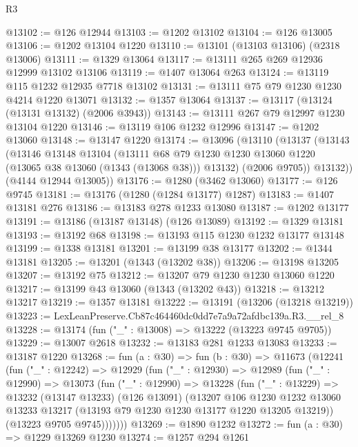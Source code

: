 \begin{lexlean}{R3}
\begin{coremodule}
@13102 := @126 @12944
@13103 := @1202 @13102
@13104 := @126 @13005
@13106 := @1202 @13104 @1220
@13110 := @13101 (@13103 @13106) (@2318 @13006)
@13111 := @1329 @13064
@13117 := @13111 @265 @269 @12936 @12999 @13102 @13106
@13119 := @1407 @13064 @263
@13124 := @13119 @115 @1232 @12935 @7718 @13102
@13131 := @13111 @75 @79 @1230 @1230 @4214 @1220 @13071
@13132 := @1357 @13064
@13137 := @13117 (@13124 (@13131 @13132) (@2006 @3943))
@13143 := @13111 @267 @79 @12997 @1230 @13104 @1220
@13146 := @13119 @106 @1232 @12996
@13147 := @1202 @13060
@13148 := @13147 @1220
@13174 := @13096
    (@13110
      (@13137
        (@13143
          (@13146
            @13148
            @13104
            (@13111
              @68
              @79
              @1230
              @1230
              @13060
              @1220
              (@13065 @38 @13060 (@1343 (@13068 @38)))
              @13132)
            (@2006 @9705))
          @13132))
      (@4144 @12944 @13005))
@13176 := @1280 (@3462 @13060)
@13177 := @126 @9745
@13181 := @13176 (@1280 (@1284 @13177) @1287)
@13183 := @1407 @13181 @276
@13186 := @13183 @278 @1233 @13080
@13187 := @1202 @13177
@13191 := @13186 (@13187 @13148) (@126 @13089)
@13192 := @1329 @13181
@13193 := @13192 @68
@13198 := @13193 @115 @1230 @1232 @13177 @13148
@13199 := @1338 @13181
@13201 := @13199 @38 @13177
@13202 := @1344 @13181
@13205 := @13201 (@1343 (@13202 @38))
@13206 := @13198 @13205
@13207 := @13192 @75
@13212 := @13207 @79 @1230 @1230 @13060 @1220
@13217 := @13199 @43 @13060 (@1343 (@13202 @43))
@13218 := @13212 @13217
@13219 := @1357 @13181
@13222 := @13191 (@13206 (@13218 @13219))
@13223 := LexLeanPreserve.Cb87c464460dc0dd7e7a9a72afdbc139a.R3.__rel_8
@13228 := @13174 (fun ("_" : @13008) => @13222 (@13223 @9745 @9705))
@13229 := @13007 @2618
@13232 := @13183 @281 @1233 @13083
@13233 := @13187 @1220
@13268 := fun (a : @30) =>
  fun (b : @30) =>
  @11673
    (@12241
      (fun ("_" : @12242) =>
      @12929
        (fun ("_" : @12930) =>
        @12989
          (fun ("_" : @12990) =>
          @13073
            (fun ("_" : @12990) =>
            @13228
              (fun ("_" : @13229) =>
              @13232
                (@13147 @13233)
                (@126 @13091)
                (@13207
                  @106
                  @1230
                  @1232
                  @13060
                  @13233
                  @13217
                  (@13193 @79 @1230 @1230 @13177 @1220 @13205 @13219))
                (@13223 @9705 @9745)))))))
@13269 := @1890 @1232
@13272 := fun (a : @30) => @1229 @13269 @1230
@13274 := @1257 @294 @1261

\end{coremodule}
\end{lexlean}
